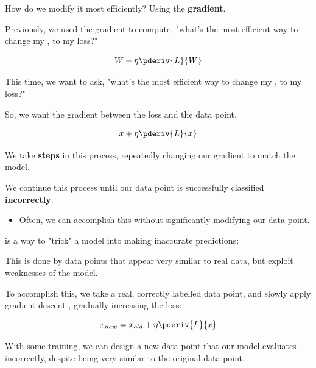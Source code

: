         How do we modify it most efficiently? Using the \textbf{gradient}.

        Previously, we used the gradient to compute, "what's the most efficient way to change my , to  my loss?"

        \begin{equation}
            W - \eta \pderiv{L}{W}
        \end{equation}

        This time, we want to ask, "what's the most efficient way to change my , to  my loss?"

        So, we want the gradient between the loss and the data point.

        \begin{equation}
            x + \eta \pderiv{L}{x}
        \end{equation}

        We take \textbf{steps} in this process, repeatedly changing our gradient to match the model.

        We continue this process until our data point is successfully classified \textbf{incorrectly}.

        \begin{itemize}
            \item Often, we can accomplish this without significantly modifying our data point.\\
        \end{itemize}

        \begin{definition}
             is a way to "trick" a model into making inaccurate predictions:
            
            This is done by  data points that appear very similar to real data, but exploit weaknesses of the model.

            \subsecdiv

            To accomplish this, we take a real, correctly labelled data point, and slowly apply gradient descent , gradually increasing the loss:

            \begin{equation*}
                x_{new} = x_{old} + \eta \pderiv{L}{x}
            \end{equation*}

            With some training, we can design a new data point that our model evaluates incorrectly, despite being very similar to the original data point.
        \end{definition}


